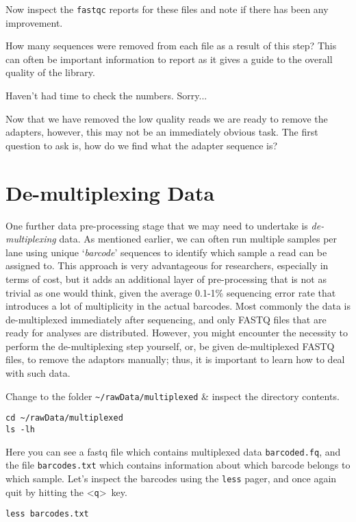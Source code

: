 Now inspect the \texttt{fastqc} reports for these files and note if there has been any improvement.
\begin{questions}
How many sequences were removed from each file as a result of this step?
This can often be important information to report as it gives a guide to the overall quality of the library. \\
\begin{answer}
Haven't had time to check the numbers. 
Sorry...
\end{answer}
\end{questions}

Now that we have removed the low quality reads we are ready to remove the adapters, however, this may not be an immediately obvious task.
The first question to ask is, how do we find what the adapter sequence is?







\section{De-multiplexing Data}

\begin{note}
One further data pre-processing stage that we may need to undertake is \textit{de-multiplexing} data.
As mentioned earlier, we can often run multiple samples per lane using unique `\textit{barcode}' sequences to identify which sample a read can be assigned to.
This approach is very advantageous for researchers, especially in terms of cost, but it adds an additional layer of pre-processing that is not as trivial as one would think, given the average 0.1-1\% sequencing error rate that introduces a lot of multiplicity in the actual barcodes. 
Most commonly the data is de-multiplexed immediately after sequencing, and only FASTQ files that are ready for analyses are distributed. 
However, you might encounter the necessity to perform the de-multiplexing step yourself, or, be given de-multiplexed FASTQ files, to remove the adaptors manually; thus, it is important to learn how to deal with such data. \\
\end{note}

\begin{steps}
Change to the folder \texttt{\~{}/rawData/multiplexed} \& inspect the directory contents.
\begin{lstlisting}
cd ~/rawData/multiplexed
ls -lh
\end{lstlisting}
Here you can see a fastq file which contains multiplexed data \texttt{barcoded.fq}, and the file \texttt{barcodes.txt} which contains information about which barcode belongs to which sample.
Let's inspect the barcodes using the \texttt{less} pager, and once again quit by hitting the \textless \texttt{q}\textgreater ~key.
\begin{lstlisting}
less barcodes.txt
\end{lstlisting}
\end{steps}

